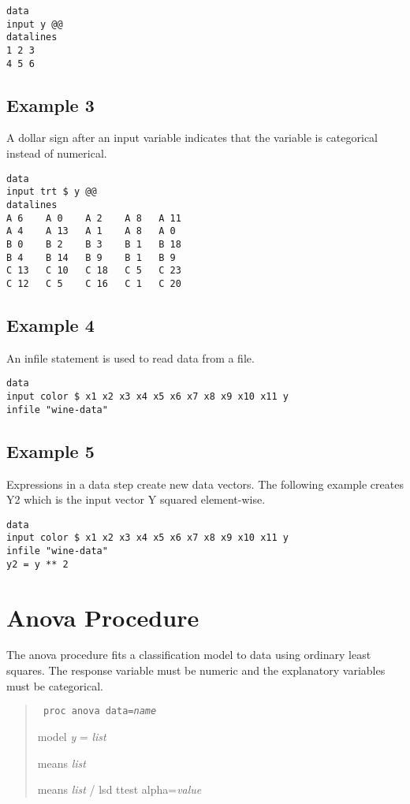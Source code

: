 \documentclass[12pt]{article}
\begin{document}
\begin{Verbatim}
data
input y @@
datalines
1 2 3
4 5 6
\end{Verbatim}

\subsection*{Example 3}
A dollar sign after an input variable indicates that the variable
is categorical instead of numerical.

\begin{Verbatim}
data
input trt $ y @@
datalines
A 6    A 0    A 2    A 8   A 11
A 4    A 13   A 1    A 8   A 0
B 0    B 2    B 3    B 1   B 18
B 4    B 14   B 9    B 1   B 9
C 13   C 10   C 18   C 5   C 23
C 12   C 5    C 16   C 1   C 20
\end{Verbatim}

\subsection*{Example 4}
An infile statement is used to read data from a file.

\begin{Verbatim}
data
input color $ x1 x2 x3 x4 x5 x6 x7 x8 x9 x10 x11 y
infile "wine-data"
\end{Verbatim}

\subsection*{Example 5}
Expressions in a data step create new data vectors.
The following example creates Y2 which is the input
vector Y squared element-wise.

\begin{Verbatim}
data
input color $ x1 x2 x3 x4 x5 x6 x7 x8 x9 x10 x11 y
infile "wine-data"
y2 = y ** 2
\end{Verbatim}

\newpage

\section{Anova Procedure}
The anova procedure fits a classification model
to data using ordinary least squares.
The response variable must be numeric and the
explanatory variables must be categorical.

\begin{quote}
{\tt
proc anova data={\it name}

model {\it y} = {\it list}

means {\it list}

means {\it list} / lsd ttest alpha={\it value}
}
\end{quote}
\end{document}
